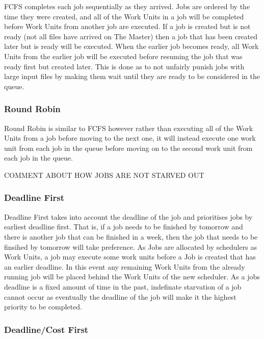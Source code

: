 FCFS completes each job sequentially as they arrived. Jobs are ordered by the time they were created, and all of the Work Units in a job will be completed before Work Units from another job are executed. If a job is created but is not ready (not all files have arrived on The Master) then a job that has been created later but is ready will be executed. When the earlier job becomes ready, all Work Units from the earlier job will be executed before resuming the job that was ready first but created later. This is done as to not unfairly punish jobs with large input files by making them wait until they are ready to be considered in the queue.

\subsubsection{Round Robin}
\label{roundrobin}

Round Robin is similar to FCFS however rather than executing all of the Work Units from a job before moving to the next one, it will instead execute one work unit from each job in the queue before moving on to the second work unit from each job in the queue. 

COMMENT ABOUT HOW JOBS ARE NOT STARVED OUT

\subsubsection{Deadline First}
\label{deadlinefirst}

Deadline First takes into account the deadline of the job and prioritises jobs by earliest deadline first. That is, if a job needs to be finished by tomorrow and there is another job that can be finished in a week, then the job that needs to be finsihed by tomorrow will take preference. As Jobs are allocated by schedulers as Work Units, a job may execute some work units before a Job is created that has an earlier deadline. In this event any remaining Work Units from the already running job will be placed behind the Work Units of the new scheduler. As a jobs deadline is a fixed amount of time in the past, indefinate starvation of a job cannot occur as eventually the deadline of the job will make it the highest priority to be completed. 

\subsubsection{Deadline\slash Cost First}
\label{deadlinecostfirst}

